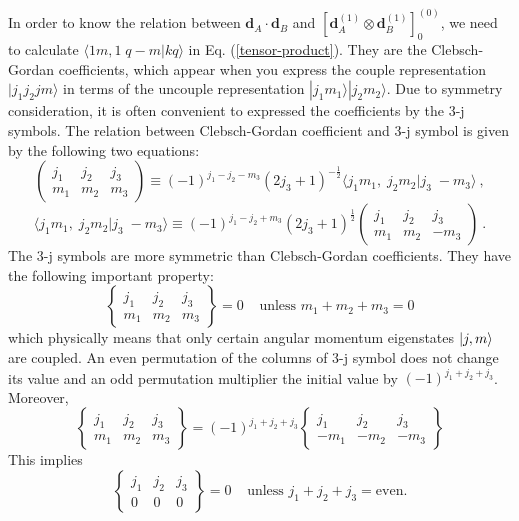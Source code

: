 In order to know the relation between $\mathbf{d}_{A}\cdot\mathbf{d}_{B}$ and $\left[ \mathbf{d}_{A}^{(1)} \otimes \mathbf{d}_{B}^{(1)} \right]_{0}^{(0)}$, we need to calculate $\langle 1m, 1\;q-m | kq \rangle$ in Eq. (\ref{tensor-product}). They are the Clebsch-Gordan coefficients, which appear when you express the couple representation $|j_{1} j_{2} j m\rangle$ in terms of the uncouple representation $|j_{1}m_{1}\rangle |j_{2}m_{2}\rangle$. Due to symmetry consideration, it is often convenient to expressed the coefficients by the 3-j symbols. The relation between Clebsch-Gordan coefficient and 3-j symbol is given by the following two equations:
\begin{equation}
\left( 
\begin{array}{ ccc }
j_{1} & j_{2} & j_{3} \\
m_{1} & m_{2} & m_{3}
\end{array}
\right) \equiv (-1)^{j_{1} - j_{2} - m_{3}} (2j_{3} +1)^{-\frac{1}{2}} \langle j_{1}m_{1}, \; j_{2} m_{2} | j_{3}\; -m_{3}\rangle \ ,
\end{equation}
\begin{equation}
 \langle j_{1}m_{1}, \; j_{2} m_{2} | j_{3}\; -m_{3}\rangle \equiv (-1)^{j_{1} - j_{2} + m_{3}} (2j_{3} +1)^{\frac{1}{2}}
\left( 
\begin{array}{ ccc }
j_{1} & j_{2} & j_{3} \\
m_{1} & m_{2} & -m_{3}
\end{array}
\right)  \ . \label{CG-3j}
\end{equation}
The 3-j symbols are more symmetric than Clebsch-Gordan coefficients. They have the following important property: 
\begin{equation}
\left\{
\begin{array}{ccc}
j_{1}&j_{2}&j_{3} \\
m_{1}&m_{2}&m_{3}
\end{array}
\right\}
=0 \;\;\;\; \mbox{unless } m_{1} + m_{2} + m_{3} = 0
\end{equation}
which physically means that only certain angular momentum eigenstates $| j,m \rangle$ are coupled.
An even permutation of the columns of 3-j symbol does not change its value and an odd permutation multiplier the initial value by $(-1)^{j_{1} + j_{2} + j_{3}}$. Moreover,
\begin{equation}
\left\{
\begin{array}{ccc}
j_{1}&j_{2}&j_{3} \\
m_{1}&m_{2}&m_{3}
\end{array}
\right\}
=
(-1)^{j_{1} + j_{2} + j_{3}}
\left\{
\begin{array}{ccc}
j_{1}&j_{2}&j_{3} \\
-m_{1}&-m_{2}&-m_{3}
\end{array}
\right\}
\end{equation}
This implies
\begin{equation}
\left\{
\begin{array}{ccc}
j_{1}&j_{2}&j_{3} \\
0&0&0
\end{array}
\right\}
=0 \;\; \;\;\mbox{unless } j_{1} + j_{2} + j_{3} = \mbox{even.}
\end{equation}

